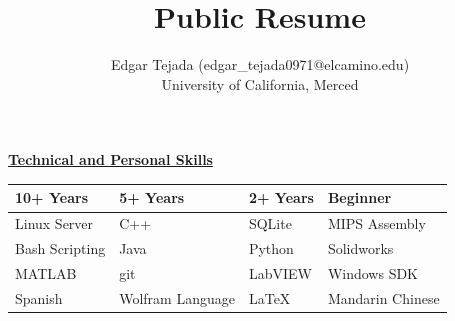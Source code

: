 \documentclass [11pt]{article}
\title{Public Resume}
\author{Edgar Tejada (edgar_tejada0971@elcamino.edu)\\University of California, Merced}
\begin{document}
\begin{flushleft}


\raggedright \underline{\textbf{Technical and Personal Skills}}
\linebreak
{
\centering
\begin{tabularx}{0.8\textwidth} { 
  | >{\centering\arraybackslash}X | 
  | >{\centering\arraybackslash}X | 
  | >{\centering\arraybackslash}X | 
  | >{\centering\arraybackslash}X |}

	\hline
	\textbf{10+ Years} & \textbf{5+ Years} & \textbf{2+ Years} & \textbf{Beginner}\\ [0.5ex]
	\hline
	Linux Server & C++ & SQLite & MIPS Assembly\\ [0.5ex]
	\hline
	Bash Scripting & Java & Python & Solidworks\\ [0.5ex]
	\hline
	MATLAB & git & LabVIEW & Windows SDK\\ [0.5ex]
	\hline
	Spanish & Wolfram Language & \LaTeX & Mandarin Chinese\\ [0.5ex]
	\hline
\end{tabularx}

}
\raggedright


\end{flushleft}
\end{document}
